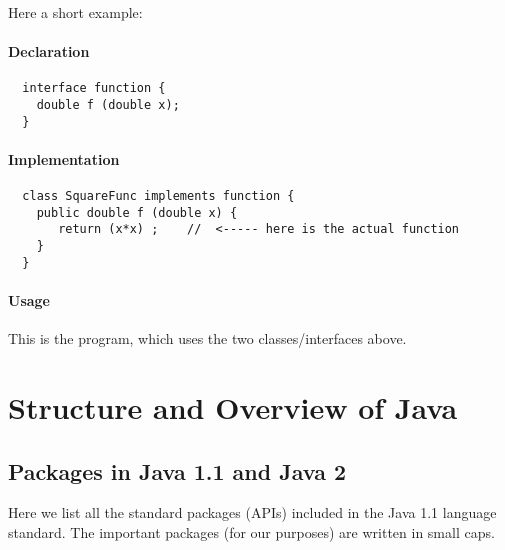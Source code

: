 Here a short example:
\paragraph{Declaration} 
\begin{verbatim}
  interface function {
    double f (double x); 
  }
\end{verbatim}

\paragraph{Implementation}
\begin{verbatim}
  class SquareFunc implements function {
    public double f (double x) {
       return (x*x) ;    //  <----- here is the actual function
    }
  }
\end{verbatim}

\paragraph{Usage} 
This is the program, which uses the two classes/interfaces above.


\section{Structure and Overview of Java}

\subsection{Packages in Java 1.1 and Java 2}

Here we list all the standard packages (APIs) included in the Java 1.1
language standard. The important packages (for our purposes) are
written in small caps.

